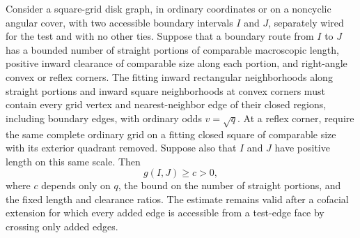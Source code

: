 \begin{lemma}
\label{sector:blank-boundary-chain}
Consider a square-grid disk graph, in ordinary coordinates or on a
noncyclic angular cover, with two accessible boundary intervals $I$ and
$J$, separately wired for the test and with no other ties.  Suppose that
a boundary route from $I$ to $J$
has a bounded number of straight portions of comparable macroscopic
length, positive inward clearance of comparable size along each
portion, and right-angle convex or reflex corners.  The fitting inward
rectangular neighborhoods along straight portions and inward square
neighborhoods at convex corners must contain every grid vertex and
nearest-neighbor edge of their closed regions, including boundary edges,
with ordinary odds $v=\sqrt q$.  At a reflex corner, require the same
complete ordinary grid on a fitting closed square of comparable size
with its exterior quadrant removed.  Suppose also that $I$ and $J$
have positive length on this same scale.  Then
\[
 g(I,J)\ge c>0,
\]
where $c$ depends only on $q$, the bound on the number of straight
portions, and the fixed length and clearance ratios.
The estimate remains valid after a cofacial extension for
which every added edge is accessible from a test-edge face by
crossing only added edges.
\end{lemma}

